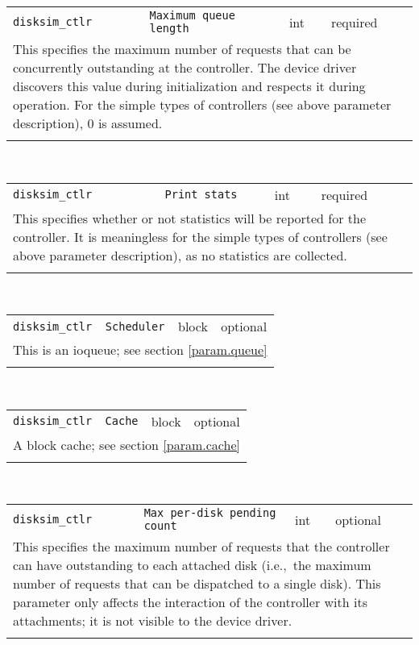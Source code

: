 \noindent 
\begin{tabular}{|p{1.5in}|p{3.5in}|p{0.5in}|p{0.5in}|}
\cline{1-4}
\texttt{disksim\_ctlr} & \texttt{Maximum queue length} & int & required \\ 
\cline{1-4}
\multicolumn{4}{|p{6in}|}{
This specifies the maximum number of requests that can be concurrently
outstanding at the controller. The device driver discovers this value
during initialization and respects it during operation. For the
simple types of controllers (see above parameter description), 0 is
assumed.
}\\ 
\cline{1-4}
\multicolumn{4}{p{5in}}{}\\
\end{tabular}\\ 
\noindent 
\begin{tabular}{|p{1.5in}|p{3.5in}|p{0.5in}|p{0.5in}|}
\cline{1-4}
\texttt{disksim\_ctlr} & \texttt{Print stats} & int & required \\ 
\cline{1-4}
\multicolumn{4}{|p{6in}|}{
This specifies whether or not statistics will be reported for the
controller. It is meaningless for the simple types of controllers
(see above parameter description), as no statistics are collected.
}\\ 
\cline{1-4}
\multicolumn{4}{p{5in}}{}\\
\end{tabular}\\ 
\noindent 
\begin{tabular}{|p{1.5in}|p{3.5in}|p{0.5in}|p{0.5in}|}
\cline{1-4}
\texttt{disksim\_ctlr} & \texttt{Scheduler} & block & optional \\ 
\cline{1-4}
\multicolumn{4}{|p{6in}|}{
This is an ioqueue; see section \ref{param.queue}
}\\ 
\cline{1-4}
\multicolumn{4}{p{5in}}{}\\
\end{tabular}\\ 
\noindent 
\begin{tabular}{|p{1.5in}|p{3.5in}|p{0.5in}|p{0.5in}|}
\cline{1-4}
\texttt{disksim\_ctlr} & \texttt{Cache} & block & optional \\ 
\cline{1-4}
\multicolumn{4}{|p{6in}|}{
A block cache; see section \ref{param.cache}
}\\ 
\cline{1-4}
\multicolumn{4}{p{5in}}{}\\
\end{tabular}\\ 
\noindent 
\begin{tabular}{|p{1.5in}|p{3.5in}|p{0.5in}|p{0.5in}|}
\cline{1-4}
\texttt{disksim\_ctlr} & \texttt{Max per-disk pending count} & int & optional \\ 
\cline{1-4}
\multicolumn{4}{|p{6in}|}{
This specifies the maximum number of requests that the controller can
have outstanding to each attached disk (i.e.,~the maximum number of
requests that can be dispatched to a single disk). This parameter
only affects the interaction of the controller with its attachments;
it is not visible to the device driver.
}\\ 
\cline{1-4}
\multicolumn{4}{p{5in}}{}\\
\end{tabular}\\ 
